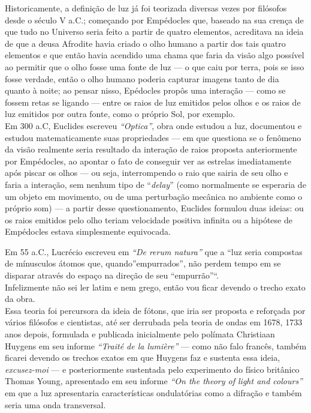 \documentclass[
  a4paper]{article}
\begin{document}
Historicamente, a definição de luz já foi teorizada diversas vezes por
filósofos desde o século V a.C.; começando por Empédocles que, baseado
na sua crença de que tudo no Universo seria feito a partir de quatro
elementos, acreditava na ideia de que a deusa Afrodite havia criado o
olho humano a partir dos tais quatro elementos e que então havia
acendido uma chama que faria da visão algo possível ao permitir que o
olho fosse uma fonte de luz --- o que caiu por terra, pois se isso fosse
verdade, então o olho humano poderia capturar imagens tanto de dia
quanto à noite; ao pensar nisso, Epédocles propôs uma interação --- como
se fossem retas se ligando --- entre os raios de luz emitidos pelos
olhos e os raios de luz emitidos por outra fonte, como o próprio Sol,
por exemplo.\\
Em 300 a.C, Euclides escreveu \emph{``Optica''}, obra onde estudou a
luz, documentou e estudou matematicamente suas propriedades --- em que
questiona se o fenômeno da visão realmente seria resultado da interação
de raios proposta anteriormente por Empédocles, ao apontar o fato de
conseguir ver as estrelas imediatamente após piscar os olhos --- ou
seja, interrompendo o raio que sairia de seu olho e faria a interação,
sem nenhum tipo de ``\emph{delay}'' (como normalmente se esperaria de um
objeto em movimento, ou de uma perturbação mecânica no ambiente como o
próprio som) --- a partir desse questionamento, Euclides formulou duas
ideias: ou os raios emitidos pelo olho teriam velocidade positiva
infinita ou a hipótese de Empédocles estava simplesmente equivocada.

Em 55 a.C., Lucrécio escreveu em \emph{``De rerum natura''} que a ``luz
seria compostas de mínusculos átomos que, quando''empurrados'', não
perdem tempo em se disparar através do espaço na direção de seu
``empurrão''``.\\
Infelizmente não sei ler latim e nem grego, então vou ficar devendo o
trecho exato da obra.\\
Essa teoria foi percursora da ideia de fótons, que iria ser proposta e
reforçada por vários filósofos e cientistas, até ser derrubada pela
teoria de ondas em 1678, 1733 anos depois, formulada e publicada
inicialmente pelo polímata Christiaan Huygens em seu informe
\emph{``Traité de la lumière''} --- como não falo francês, também
ficarei devendo os trechos exatos em que Huygens faz e sustenta essa
ideia, \emph{excusez-moi} --- e posteriormente sustentada pelo
experimento do físico britânico Thomas Young, apresentado em seu informe
\emph{``On the theory of light and colours''} em que a luz apresentaria
características ondulatórias como a difração e também seria uma onda
transversal.
\end{document}
